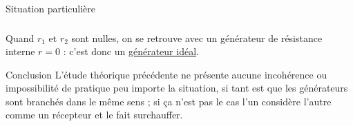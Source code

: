 \documentclass[../main/main.tex]{subfiles}
\begin{document}
\begin{tcbraster}[raster columns=2, raster equal height=rows]
    \begin{NCcoro}{Situation particulière}
        \subsubsection{}
        Quand $r_1$ et $r_2$ sont nulles, on se retrouve avec un générateur de
        résistance interne $r = 0$ : c'est donc un \underline{générateur idéal}.
    \end{NCcoro}
    \begin{NCimpo}{Conclusion}
        L'étude théorique précédente ne présente aucune incohérence ou
        impossibilité de pratique peu importe la situation, si tant est que les
        générateurs sont branchés dans le même sens ; si ça n'est pas le cas
        l'un considère l'autre comme un récepteur et le fait surchauffer.
    \end{NCimpo}
\end{tcbraster}
\vfill
\end{document}
